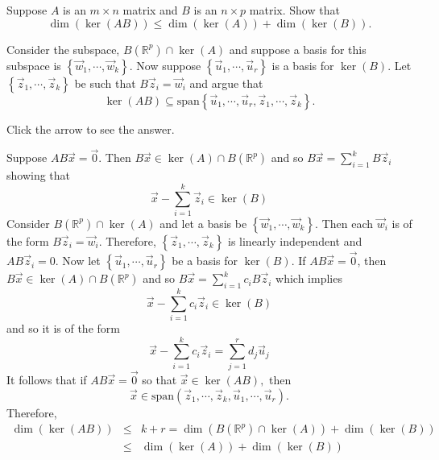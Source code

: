 \documentclass{ximera}
\begin{document}
\begin{problem}\label{prb:5.30} Suppose $A$ is an $m\times n$ matrix and $B$ is an $n\times p$ matrix.
Show that
\begin{equation*}
\dim \left( \ker \left( AB\right) \right) \leq \dim \left( \ker \left(
A\right) \right) +\dim \left( \ker \left( B\right) \right) .
\end{equation*}
\begin{hint}
Consider the subspace, $B\left( \mathbb{R}^{p}\right) \cap
\ker \left( A\right) $ and suppose a basis for this subspace is $\left\{
\vec{w}_{1},\cdots ,\vec{w}_{k}\right\} .$ Now suppose $\left\{
\vec{u}_{1},\cdots ,\vec{u}_{r}\right\} $ is a basis for $\ker \left(
B\right) .$ Let $\left\{ \vec{z}_{1},\cdots ,\vec{z}_{k}\right\} $ be
such that $B\vec{z}_{i}=\vec{w}_{i}$ and argue that
\begin{equation*}
\ker \left( AB\right) \subseteq \mbox{span}\left\{ \vec{u}_{1},\cdots ,
\vec{u}_{r},\vec{z}_{1},\cdots ,\vec{z}_{k}\right\} .
\end{equation*}

Click the arrow to see the answer.
\begin{expandable}
Suppose $AB\vec{x}=\vec{0}.$ Then $B\vec{x}\in \ker
\left( A\right) \cap B\left( \mathbb{R}^{p}\right) $ and so $B\vec{x}
=\sum_{i=1}^{k}B\vec{z}_{i}$ showing that
\[
\vec{x}-\sum_{i=1}^{k}\vec{z}_{i}\in \ker \left( B\right)
\]
Consider $B\left( \mathbb{R}^{p}\right) \cap \ker \left( A\right) $ and let
a basis be $\left\{ \vec{w}_{1},\cdots ,\vec{w}_{k}\right\} .$ Then
each $\vec{w}_{i}$ is of the form $B\vec{z}_{i}=\vec{w}_{i}$.
Therefore, $\left\{ \vec{z}_{1},\cdots ,\vec{z}_{k}\right\} $ is
linearly independent and $AB\vec{z}_{i}=0.$ Now let $\left\{ \vec{u}
_{1},\cdots ,\vec{u}_{r}\right\} $ be a basis for $\ker \left( B\right) .$
If $AB\vec{x}=\vec{0}$, then $B\vec{x} \in \ker \left( A\right) \cap B\left(
\mathbb{R}^{p}\right) $ and so $B\vec{x}=\sum_{i=1}^{k}c_{i}B\vec{z}
_{i}$ which implies
\[
\vec{x}-\sum_{i=1}^{k}c_{i}\vec{z}_{i}\in \ker \left( B\right)
\]
and so it is of the form
\[
\vec{x}-\sum_{i=1}^{k}c_{i}\vec{z}_{i}=\sum_{j=1}^{r}d_{j}\vec{u}
_{j}
\]
It follows that if $AB\vec{x}=\vec{0}$ so that $\vec{x}\in \ker \left(
AB\right) ,$ then
\[
\vec{x}\in \mbox{span}\left( \vec{z}_{1},\cdots ,\vec{z}_{k},
\vec{u}_{1},\cdots ,\vec{u}_{r}\right) .
\]
Therefore,
\begin{eqnarray*}
\dim \left( \ker \left( AB\right) \right)  &\leq &k+r=\dim \left( B\left(
\mathbb{R}^{p}\right) \cap \ker \left( A\right) \right) +\dim \left( \ker
\left( B\right) \right)  \\
&\leq &\dim \left( \ker \left( A\right) \right) +\dim \left( \ker \left(
B\right) \right)
\end{eqnarray*}
\end{expandable}
\end{hint}
\end{problem}
\end{document}
